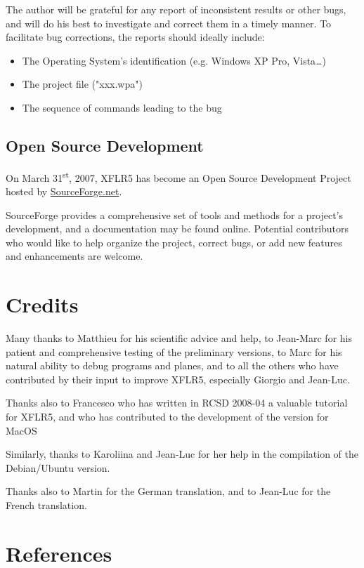 \documentclass[a4paper,twoside,12pt,dvips]{article}
\begin{document}
The author will be grateful for any report of inconsistent results or
other bugs, and will do his best to investigate and correct them in a
timely manner. To facilitate bug corrections, the reports should
ideally include:

\begin{itemize}
\item The Operating System{\textquoteright}s identification (e.g. Windows XP
Pro, Vista{\dots})
\item The project file ("xxx.wpa")
\item The sequence of commands leading to the bug
\end{itemize}

\subsection{Open Source Development}

On March 31\textsuperscript{st}, 2007, XFLR5 has become an Open Source
Development Project hosted by
\href{http://sourceforge.net/projects/xflr5}{SourceForge.net}.

SourceForge provides a comprehensive set of tools and methods for a
project's development, and a documentation may be found
online. Potential contributors who would like to help organize the
project, correct bugs, or add new features and enhancements are
welcome.

\section{Credits}

Many thanks to Matthieu for his scientific advice and help, to Jean-Marc
for his patient and comprehensive testing of the preliminary versions,
to Marc for his natural ability to debug programs and planes, and to
all the others who have contributed by their input to improve XFLR5,
especially Giorgio and Jean-Luc.

Thanks also to Francesco who has written in RCSD 2008-04 a valuable
tutorial for XFLR5, and who has contributed to the development of the
version for MacOS

Similarly, thanks to Karoliina and Jean-Luc for her help in the
compilation of the Debian/Ubuntu version.

Thanks also to Martin for the German translation, and to Jean-Luc for
the French translation.

\clearpage

\section{References}
\end{document}
